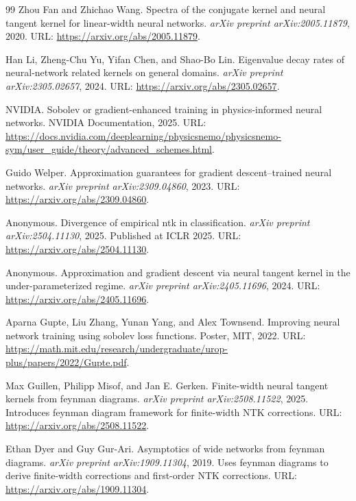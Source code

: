 \documentclass[a4paper]{article}
\theoremstyle{plain}
\theoremstyle{definition}
\theoremstyle{remark}
\begin{document}
\begin{thebibliography}{99}
Zhou Fan and Zhichao Wang.
Spectra of the conjugate kernel and neural tangent kernel for linear-width neural networks.
\textit{arXiv preprint arXiv:2005.11879}, 2020.
URL: \url{https://arxiv.org/abs/2005.11879}.

Han Li, Zheng-Chu Yu, Yifan Chen, and Shao-Bo Lin.
Eigenvalue decay rates of neural-network related kernels on general domains.
\textit{arXiv preprint arXiv:2305.02657}, 2024.
URL: \url{https://arxiv.org/abs/2305.02657}.

NVIDIA.
Sobolev or gradient-enhanced training in physics-informed neural networks.
NVIDIA Documentation, 2025.
URL: \url{https://docs.nvidia.com/deeplearning/physicsnemo/physicsnemo-sym/user_guide/theory/advanced_schemes.html}.

Guido Welper.
Approximation guarantees for gradient descent--trained neural networks.
\textit{arXiv preprint arXiv:2309.04860}, 2023.
URL: \url{https://arxiv.org/abs/2309.04860}.

Anonymous.
Divergence of empirical ntk in classification.
\textit{arXiv preprint arXiv:2504.11130}, 2025.
Published at ICLR 2025.
URL: \url{https://arxiv.org/abs/2504.11130}.

Anonymous.
Approximation and gradient descent via neural tangent kernel in the under-parameterized regime.
\textit{arXiv preprint arXiv:2405.11696}, 2024.
URL: \url{https://arxiv.org/abs/2405.11696}.

Aparna Gupte, Liu Zhang, Yunan Yang, and Alex Townsend.
Improving neural network training using sobolev loss functions.
Poster, MIT, 2022.
URL: \url{https://math.mit.edu/research/undergraduate/urop-plus/papers/2022/Gupte.pdf}.

Max Guillen, Philipp Misof, and Jan E. Gerken.
Finite-width neural tangent kernels from feynman diagrams.
\textit{arXiv preprint arXiv:2508.11522}, 2025.
Introduces feynman diagram framework for finite-width NTK corrections.
URL: \url{https://arxiv.org/abs/2508.11522}.

Ethan Dyer and Guy Gur-Ari.
Asymptotics of wide networks from feynman diagrams.
\textit{arXiv preprint arXiv:1909.11304}, 2019.
Uses feynman diagrams to derive finite-width corrections and first-order NTK corrections.
URL: \url{https://arxiv.org/abs/1909.11304}.


\end{thebibliography}
\end{document}
